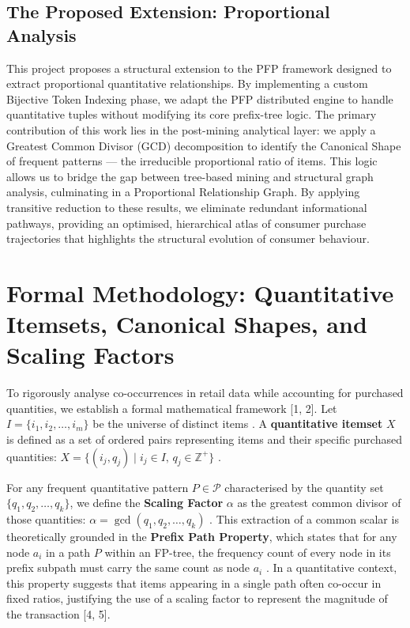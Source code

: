 \documentclass[10pt, twocolumn]{article}
\begin{document}
\subsection{The Proposed Extension: Proportional Analysis}

This project proposes a structural extension to the PFP framework designed to
extract proportional quantitative relationships. By implementing a custom
Bijective Token Indexing phase, we adapt the PFP distributed engine to handle
quantitative tuples without modifying its core prefix-tree logic.
The primary contribution of this work lies in the post-mining analytical layer:
we apply a Greatest Common Divisor (GCD) decomposition to identify the
Canonical Shape of frequent patterns — the irreducible proportional ratio of
items.
This logic allows us to bridge the gap between tree-based mining and structural
graph analysis, culminating in a Proportional Relationship Graph.
By applying transitive reduction to these results, we eliminate redundant
informational pathways, providing an optimised, hierarchical atlas of consumer
purchase trajectories that highlights the structural evolution of consumer
behaviour.

\section{Formal Methodology: Quantitative Itemsets, Canonical Shapes,
  and Scaling Factors}

To rigorously analyse co-occurrences in retail data while accounting for
purchased quantities, we establish a formal mathematical framework [1, 2]. Let
$I = \{i_1, i_2, \dots, i_m\}$ be the universe of distinct items . A
\textbf{quantitative itemset} $X$ is defined as a set of ordered pairs
representing items and their specific purchased quantities:
$X = \{ (i_j, q_j) \mid i_j \in I,\, q_j \in \mathbb{Z}^+ \}$ .

For any frequent quantitative pattern $P \in \mathcal{P}$ characterised by
the quantity set $\{q_1, q_2, \dots, q_k\}$, we define the \textbf{Scaling
Factor} $\alpha$ as the greatest common divisor of those quantities:
$\alpha = \gcd(q_1, q_2, \dots, q_k)$ . This extraction of a common scalar
is theoretically grounded in the \textbf{Prefix Path Property}, which states
that for any node $a_i$ in a path $P$ within an FP-tree, the frequency count
of every node in its prefix subpath must carry the same count as node $a_i$
. In a quantitative context, this property suggests that items appearing in
a single path often co-occur in fixed ratios, justifying the use of a scaling
factor to represent the magnitude of the transaction [4, 5].
\end{document}
